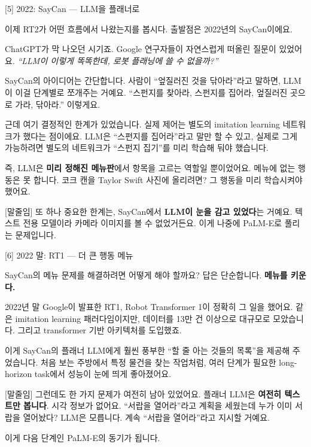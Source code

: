 \documentclass[aspectratio=169,10pt]{beamer}
\newenvironment{script}{%
  \footnotesize
  \setlength{\parskip}{0.5em}
  \setlength{\parindent}{0pt}
}{}
\begin{document}
\begin{frame}{[5] 2022: SayCan --- LLM을 플래너로}
\begin{script}
이제 RT2가 어떤 흐름에서 나왔는지를 봅시다. 출발점은 2022년의 SayCan이에요.

ChatGPT가 막 나오던 시기죠. Google 연구자들이 자연스럽게 떠올린 질문이 있었어요. \textit{``LLM이 이렇게 똑똑한데, 로봇 플래닝에 쓸 수 없을까?''}

SayCan의 아이디어는 간단합니다. 사람이 ``엎질러진 것을 닦아라''라고 말하면, LLM이 이걸 단계별로 쪼개주는 거예요. ``스펀지를 찾아라, 스펀지를 집어라, 엎질러진 곳으로 가라, 닦아라.'' 이렇게요.

근데 여기 결정적인 한계가 있었습니다. \alert{실제 제어는 별도의 imitation learning 네트워크가 했다}는 점이에요. LLM은 ``스펀지를 집어라''라고 말만 할 수 있고, 실제로 그게 가능하려면 별도의 네트워크가 ``스펀지 집기''를 미리 학습해 둬야 했습니다.

즉, LLM은 \textbf{미리 정해진 메뉴판}에서 항목을 고르는 역할일 뿐이었어요. 메뉴에 없는 행동은 못 합니다. 코크 캔을 Taylor Swift 사진에 올리려면? 그 행동을 미리 학습시켜야 했어요.

[말줄임] 또 하나 중요한 한계는, SayCan에서 \textbf{LLM이 눈을 감고 있었다}는 거예요. 텍스트 전용 모델이라 카메라 이미지를 볼 수 없었거든요. 이게 나중에 PaLM-E로 풀리는 문제입니다.
\end{script}
\end{frame}

\begin{frame}{[6] 2022 말: RT1 --- 더 큰 행동 메뉴}
\begin{script}
SayCan의 메뉴 문제를 해결하려면 어떻게 해야 할까요? 답은 단순합니다. \textbf{메뉴를 키운다.}

2022년 말 Google이 발표한 RT1, Robot Transformer 1이 정확히 그 일을 했어요. 같은 imitation learning 패러다임이지만, 데이터를 \alert{13만 건 이상}으로 대규모로 모았습니다. 그리고 transformer 기반 아키텍처를 도입했죠.

이게 SayCan의 플래너 LLM에게 훨씬 풍부한 ``할 줄 아는 것들의 목록''을 제공해 주었습니다. 처음 보는 주방에서 특정 물건을 찾는 작업처럼, 여러 단계가 필요한 long-horizon task에서 성능이 눈에 띄게 좋아졌어요.

[말줄임] 그런데도 한 가지 문제가 여전히 남아 있었어요. 플래너 LLM은 \textbf{여전히 텍스트만 봅니다}. 시각 정보가 없어요. ``서랍을 열어라''라고 계획을 세웠는데 누가 이미 서랍을 열어놨다? LLM은 모릅니다. 계속 ``서랍을 열어라''라고 지시할 거예요.

이게 다음 단계인 PaLM-E의 동기가 됩니다.
\end{script}
\end{frame}
\end{document}
